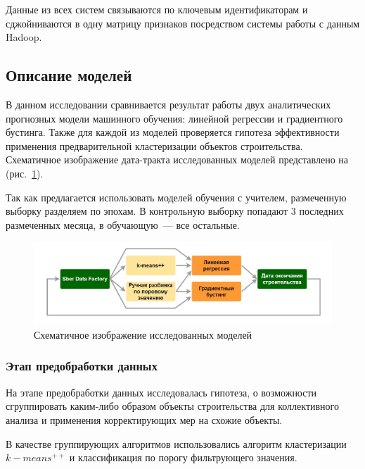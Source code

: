 \documentclass[12pt,a4paper]{article} %
\begin{document}
Данные из всех систем связываются по ключевым идентификаторам и сджойниваются в одну матрицу признаков посредством системы работы с данным Hadoop.

\subsection{Описание моделей}

В данном исследовании сравнивается результат работы двух аналитических прогнозных модели машинного обучения: линейной регрессии и градиентного бустинга.
Также для каждой из моделей проверяется гипотеза эффективности применения предварительной кластеризации объектов строительства. Схематичное изображение дата-тракта исследованных моделей представлено на (рис.~\ref{fig:data_tract}). 

Так как предлагается использовать моделей обучения с учителем, размеченную выборку разделяем по эпохам. В контрольную выборку попадают 3 последних размеченных месяца, в обучающую~--- все остальные.  

 
\begin{figure}[h]
	
	\centering
	
	\includegraphics[width=\linewidth]{data_tract.jpg}
	
	\caption{Схематичное изображение исследованных моделей}
	
	\label{fig:data_tract}
	
\end{figure} 
 
 
 
\subsubsection{Этап предобработки данных}
 
На этапе предобработки данных исследовалась гипотеза, о возможности сгруппировать каким-либо образом объекты строительства для коллективного анализа и применения корректирующих мер на схожие объекты. 

В качестве группирующих алгоритмов использовались алгоритм кластеризации $k-means^{++}$ и классификация по порогу фильтрующего значения.
\end{document}
